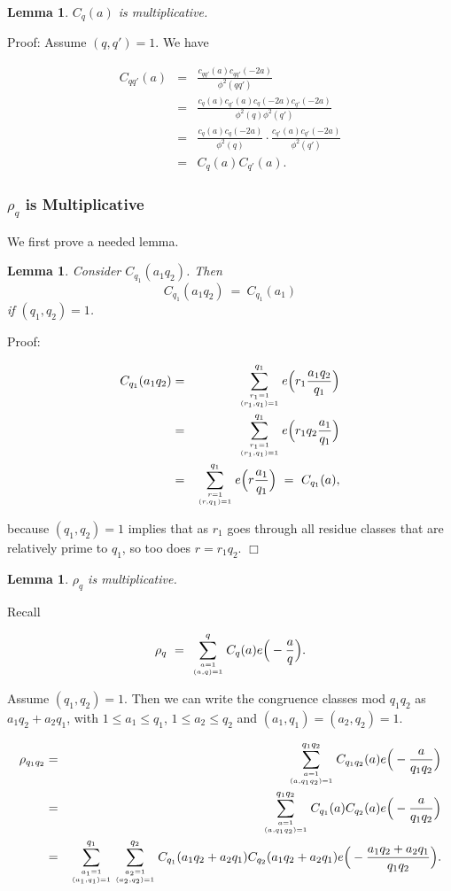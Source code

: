 \documentclass[12pt,letterpaper]{report}
\newcommand\be{\begin{equation}}
\newcommand\ee{\end{equation}}
\newcommand\bea{\begin{eqnarray}}
\newcommand\eea{\end{eqnarray}}
\newtheorem{lem}[thm]{Lemma}
\begin{document}
\begin{lem} $C_q(a)$ is multiplicative. \end{lem}

Proof: Assume $(q,q') = 1$. We have

\bea C_{qq'}(a) &=& \frac{ c_{qq'}(a) c_{qq'}(-2a)}{\phi^2(qq')}
\nonumber\\ &=& \frac{ c_q(a)c_{q'}(a) c_{q}(-2a)
c_{q'}(-2a)}{\phi^2(q) \phi^2(q')} \nonumber\\ &=& \frac{
c_q(a)c_{q}(-2a)}{\phi^2(q)} \cdot \frac{ c_{q'}(a)
c_{q'}(-2a)}{\phi^2(q')} \nonumber\\ &=& C_q(a) C_{q'}(a). \eea



\subsubsection{$\rho_q$ is Multiplicative}

We first prove a needed lemma.

\begin{lem} Consider $C_{q_1}(a_1q_2)$. Then
\be C_{q_1}(a_1q_2) \  = \  C_{q_1}(a_1) \ee if $(q_1,q_2) = 1$.
\end{lem}

Proof:

\bea C_{q_1}(a_1q_2) &=& \sum_{r_1 = 1 \atop (r_1,q_1)=1}^{q_1}
e\Big( r_1 \frac{a_1q_2}{q_1} \Big) \nonumber\\ &=& \sum_{r_1 = 1
\atop (r_1,q_1)=1}^{q_1} e\Big( r_1q_2 \frac{a_1}{q_1} \Big)
\nonumber\\ &=& \sum_{r = 1 \atop (r,q_1)=1}^{q_1} e\Big( r
\frac{a_1}{q_1} \Big) \ = \ C_{q_1}(a), \eea

because $(q_1,q_2) = 1$ implies that as $r_1$ goes through all
residue classes that are relatively prime to $q_1$, so too does $r
=  r_1q_2$. $\Box$

\begin{lem} $\rho_q$ is multiplicative. \end{lem}

Recall

\be \rho_q \ = \ \sum_{a = 1 \atop (a,q)=1}^q C_q(a) e\Big( -
\frac{a}{q} \Big). \ee

Assume $(q_1,q_2) = 1$. Then we can write the congruence classes
mod $q_1q_2$ as $a_1q_2 + a_2q_1$, with $1 \le a_1 \le q_1$, $1
\le a_2 \le q_2$ and $(a_1,q_1) = (a_2,q_2) = 1$.

\bea \rho_{q_1q_2} &=& \sum_{a = 1 \atop (a,q_1q_2) = 1}^{q_1q_2}
C_{q_1q_2}(a) e\Big( -\frac{a}{q_1q_2} \Big) \nonumber\\ &=&
\sum_{a = 1 \atop (a,q_1q_2) = 1}^{q_1q_2}
C_{q_1}(a) C_{q_2}(a) e\Big( -\frac{a}{q_1q_2} \Big) \nonumber\\
&=& \sum_{a_1 = 1 \atop (a_1,q_1) = 1}^{q_1} \sum_{a_2 = 1 \atop
(a_2,q_2) = 1}^{q_2} C_{q_1}(a_1q_2+a_2q_1) C_{q_2}(a_1q_2+a_2q_1)
e\Big( -\frac{a_1q_2+a_2q_1}{q_1q_2} \Big). \nonumber\\ & & \eea
\end{document}
